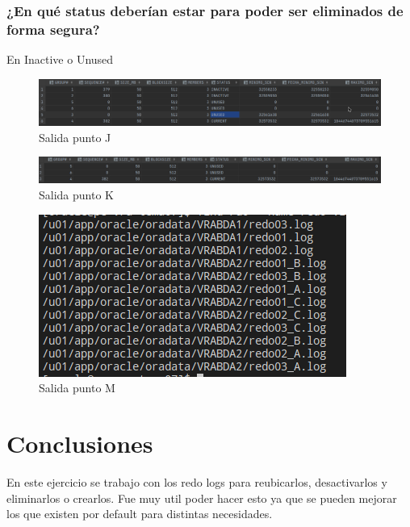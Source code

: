 \documentclass[journal]{IEEEtran}
\begin{document}
\subsubsection{¿En qué status deberían estar para poder ser eliminados de forma segura?}
En Inactive o Unused
\begin{figure}[H]
  \centering
  \includegraphics[scale=.20]{captura_6.png}
   \caption{Salida punto J}
   \label{fig:validador_7}
\end{figure}
\begin{figure}[H]
  \centering
  \includegraphics[scale=.20]{captura_7.png}
   \caption{Salida punto K}
   \label{fig:validador_8}
\end{figure}
\begin{figure}[H]
  \centering
  \includegraphics[scale=.25]{captura_8.png}
   \caption{Salida punto M}
   \label{fig:validador_9}
\end{figure}

\section{Conclusiones}
En este ejercicio se trabajo con los redo logs para reubicarlos, desactivarlos y eliminarlos 
o crearlos. Fue muy util poder hacer esto ya que se pueden mejorar los que existen por default para 
distintas necesidades.
\ifCLASSOPTIONcaptionsoff
  \newpage

\fi
\end{document}
